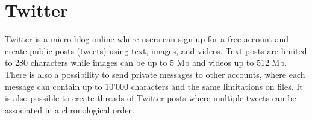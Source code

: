 \section{Twitter}
Twitter is a micro-blog online where users can sign up for a free account and create public posts (tweets) using text, images, and videos. Text posts are limited to 280 characters while images can be up to 5 Mb and videos up to 512 Mb\cite{MediaBestPractices}. There is also a possibility to send private messages to other accounts, where each message can contain up to 10'000 characters and the same limitations on files. It is also possible to create threads of Twitter posts where multiple tweets can be associated in a chronological order.